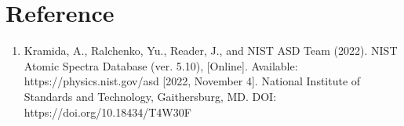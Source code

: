 \documentclass[11pt]{book}
\theoremstyle{break}
\theoremstyle{break}
\begin{document}
\section{Reference}
\begin{enumerate}
\item Kramida, A., Ralchenko, Yu., Reader, J., and NIST ASD Team (2022). NIST Atomic Spectra Database (ver. 5.10), [Online]. Available: https://physics.nist.gov/asd [2022, November 4]. National Institute of Standards and Technology, Gaithersburg, MD. DOI: https://doi.org/10.18434/T4W30F
\end{enumerate}
\end{document}
